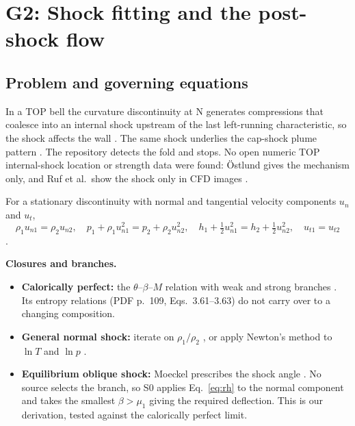 \section{G2: Shock fitting and the post-shock flow}
\label{sec:g2}
\subsection{Problem and governing equations}
In a TOP bell the curvature discontinuity at N generates compressions that coalesce
into an internal shock upstream of the last left-running characteristic, so the shock
affects the wall \cite[PDF p.~26, printed p.~18, Sec.~3.5]{ostlund}. The same shock
underlies the cap-shock plume pattern \cite[PDF p.~3, printed p.~480]{frey}. The
repository detects the fold and stops. No open numeric TOP internal-shock location or
strength data were found: Östlund gives the mechanism only, and Ruf et al.\ show the
shock only in CFD images \cite{ruf2010}.

For a stationary discontinuity with normal and tangential velocity components
$u_n$ and $u_t$,
\begin{equation}
\rho_1u_{n1}=\rho_2u_{n2},\quad p_1+\rho_1u_{n1}^2=p_2+\rho_2u_{n2}^2,\quad
h_1+\tfrac12u_{n1}^2=h_2+\tfrac12u_{n2}^2,\quad u_{t1}=u_{t2}
\label{eq:rh}
\end{equation}
\cite[PDF p.~104, Eqs.~3.38--3.40; PDF pp.~150--151, Eqs.~4.3--4.6]{anderson}.

\textbf{Closures and branches.}
\begin{itemize}
\item \textbf{Calorically perfect:} the $\theta$--$\beta$--$M$ relation with weak and
strong branches \cite[PDF pp.~152--154, printed pp.~136--138]{anderson}. Its entropy
relations (PDF p.~109, Eqs.~3.61--3.63) do not carry over to a changing composition.
\item \textbf{General normal shock:} iterate on $\rho_1/\rho_2$
\cite[PDF pp.~665--666, printed pp.~649--650, Eqs.~17.1--17.10]{anderson}, or apply
Newton's method to $\ln T$ and $\ln p$
\cite[PDF pp.~39--40, printed pp.~33--34, Eqs.~7.6--7.19]{gordon1994}.
\item \textbf{Equilibrium oblique shock:} Moeckel prescribes the shock angle
\cite[PDF pp.~3--4, printed pp.~2--3, Eqs.~5--7]{moeckel1957}. No source selects the
branch, so S0 applies Eq.~\eqref{eq:rh} to the normal component and takes the
smallest $\beta>\mu_1$ giving the required deflection. This is our derivation,
tested against the calorically perfect limit.
\end{itemize}

